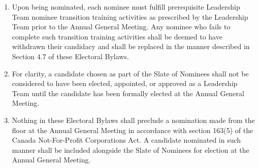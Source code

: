 \begin{enumerate}
\begin{enumerate}
   \item the Board may call a further Nomination Meeting if time permits; and
   \item if no further Nomination Meeting is held, the position may be filled through a nomination at the Annual General Meeting.
  \end{enumerate}
 \item Upon being nominated, each nominee must fulfill prerequisite Leadership Team nominee transition training activities as prescribed by the Leadership Team prior to the Annual General Meeting. Any nominee who fails to complete such transition training activities shall be deemed to have withdrawn their candidacy and shall be replaced in the manner described in Section 4.7 of these Electoral Bylaws.
 \item For clarity, a candidate chosen as part of the Slate of Nominees shall not be considered to have been elected, appointed, or approved as a Leadership Team until the candidate has been formally elected at the Annual General Meeting.
 \item Nothing in these Electoral Bylaws shall preclude a nomination made from the floor at the Annual General Meeting in accordance with section 163(5) of the Canada Not-For-Profit Corporations Act. A candidate nominated in such manner shall be included alongside the Slate of Nominees for election at the Annual General Meeting.
\end{enumerate}
